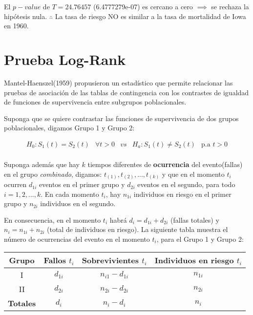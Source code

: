 \documentclass[
  a4paper,
  oneside,
  openany]{book}
\begin{document}
El \(p-value\) de \(T = 24.76457\) (6.4777279e-07) es cercano a cero \(\implies\) se rechaza la hipótesis nula. \(\therefore\) La tasa de riesgo NO es similar a la tasa de mortalidad de Iowa en 1960.

\hypertarget{prueba-log-rank}{%
\section{Prueba Log-Rank}\label{prueba-log-rank}}

Mantel-Haenszel(1959) propusieron un estadístico que permite relacionar las pruebas de asociación de las tablas de contingencia con los contrastes de igualdad de funciones de supervivencia entre subgrupos poblacionales.

Suponga que se quiere contrastar las funciones de supervivencia de dos grupos poblacionales, digamos Grupo 1 y Grupo 2:

\[
\begin{array}{lllll}
H_{0}:S_{1}(t) = S_{2}(t) & \forall t>0 & vs & H_{a}:S_{1}(t) \neq S_{2}(t) & \mbox{p.a } t>0\\
\end{array}
\]

Suponga además que hay \(k\) tiempos diferentes de \textbf{ocurrencia} del evento(fallas) en el grupo \emph{combinado}, digamos: \(t_{(1)},t_{(2)}, ... ,t_{(k)}\) y que en el momento \(t_i\) ocurren \(d_{1i}\) eventos en el primer grupo y \(d_{2i}\) eventos en el segundo, para todo \(i=1,2,...,k\). En cada momento \(t_i\), hay \(n_{1i}\) individuos en riesgo en el primer grupo y \(n_{2i}\) individuos en el segundo.

En consecuencia, en el momento \(t_i\) habrá \(d_i=d_{1i}+d_{2i}\) (fallas totales) y \(n_i=n_{1i}+n_{2i}\) (total de individuos en riesgo). La siguiente tabla muestra el número de ocurrencias del evento en el momento \(t_i\), para el Grupo 1 y Grupo 2:

\begin{table}
\centering
\begin{tabular}{>{}c|>{}c|>{}c|c}
\toprule
Grupo & Fallos $t_{i}$ & Sobrevivientes $t_{i}$ & Individuos en riesgo $t_{i}$\\
\midrule
I & $d_{1i}$ & $n_{i1}-d_{1i}$ & $n_{1i}$\\
II & $d_{2i}$ & $n_{2i}-d_{2i}$ & $n_{2i}$\\
\textbf{Totales} & \textbf{$d_{i}$} & \textbf{$n_{i}-d_{i}$} & \textbf{$n_{i}$}\\
\bottomrule
\end{tabular}
\end{table}
\end{document}
